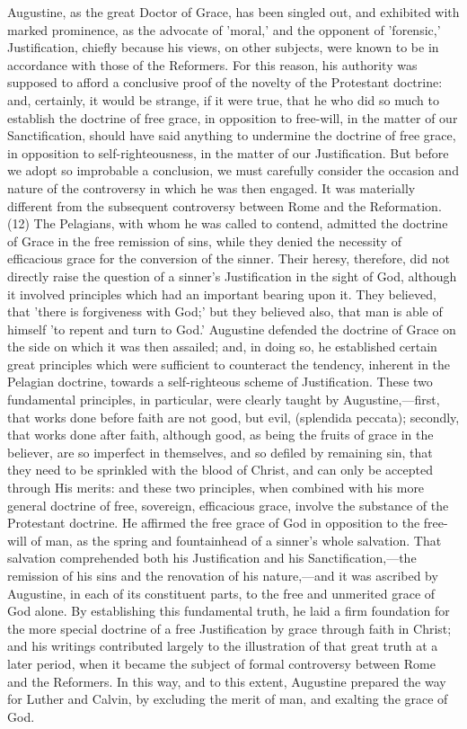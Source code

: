 \documentclass[
]{book}
\begin{document}
Augustine, as the great Doctor of Grace, has been singled out, and exhibited with marked prominence, as the advocate of 'moral,' and the opponent of 'forensic,' Justification, chiefly because his views, on other subjects, were known to be in accordance with those of the Reformers. For this reason, his authority was supposed to afford a conclusive proof of the novelty of the Protestant doctrine: and, certainly, it would be strange, if it were true, that he who did so much to establish the doctrine of free grace, in opposition to free-will, in the matter of our Sanctification, should have said anything to undermine the doctrine of free grace, in opposition to self-righteousness, in the matter of our Justification. But before we adopt so improbable a conclusion, we must carefully consider the occasion and nature of the controversy in which he was then engaged. It was materially different from the subsequent controversy between Rome and the Reformation. (12) The Pelagians, with whom he was called to contend, admitted the doctrine of Grace in the free remission of sins, while they denied the necessity of efficacious grace for the conversion of the sinner. Their heresy, therefore, did not directly raise the question of a sinner's Justification in the sight of God, although it involved principles which had an important bearing upon it. They believed, that 'there is forgiveness with God;' but they believed also, that man is able of himself 'to repent and turn to God.' Augustine defended the doctrine of Grace on the side on which it was then assailed; and, in doing so, he established certain great principles which were sufficient to counteract the tendency, inherent in the Pelagian doctrine, towards a self-righteous scheme of Justification. These two fundamental principles, in particular, were clearly taught by Augustine,---first, that works done before faith are not good, but evil, (splendida peccata); secondly, that works done after faith, although good, as being the fruits of grace in the believer, are so imperfect in themselves, and so defiled by remaining sin, that they need to be sprinkled with the blood of Christ, and can only be accepted through His merits: and these two principles, when combined with his more general doctrine of free, sovereign, efficacious grace, involve the substance of the Protestant doctrine. He affirmed the free grace of God in opposition to the free-will of man, as the spring and fountainhead of a sinner's whole salvation. That salvation comprehended both his Justification and his Sanctification,---the remission of his sins and the renovation of his nature,---and it was ascribed by Augustine, in each of its constituent parts, to the free and unmerited grace of God alone. By establishing this fundamental truth, he laid a firm foundation for the more special doctrine of a free Justification by grace through faith in Christ; and his writings contributed largely to the illustration of that great truth at a later period, when it became the subject of formal controversy between Rome and the Reformers. In this way, and to this extent, Augustine prepared the way for Luther and Calvin, by excluding the merit of man, and exalting the grace of God.
\end{document}

